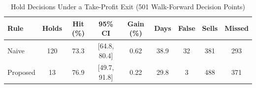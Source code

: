 \begin{table}[!t]
\caption{Hold Decisions Under a Take-Profit Exit (501 Walk-Forward Decision Points)}
\label{tab:decisions}
\centering
\footnotesize
\setlength{\tabcolsep}{2.5pt}
\begin{tabular}{lcccccccc}
\hline
Rule & Holds & Hit (\%) & 95\% CI & Gain (\%) & Days & False & Sells & Missed \\
\hline
Naive & 120 & 73.3 & [64.8, 80.4] & 0.62 & 38.9 & 32 & 381 & 293 \\
Proposed & 13 & 76.9 & [49.7, 91.8] & 0.22 & 29.8 & 3 & 488 & 371 \\
\hline
\end{tabular}
\end{table}

